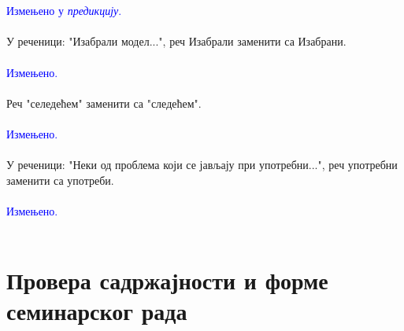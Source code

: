 \documentclass[a4paper]{report}
\newcommand{\odgovor}[1]{\textcolor{blue}{#1}}
\begin{document}
    \\\\
    \odgovor{Измењено у \emph{предикцију}.} 
	\\\\
У реченици: "Изабрали модел...", реч Изабрали заменити са Изабрани.
    \\\\
    \odgovor{Измењено.} 
	\\\\
Реч "селедећем" заменити са "следећем".
    \\\\
    \odgovor{Измењено.} 
	\\\\
У реченици: "Неки од проблема који се јављају при употребни...", реч употребни заменити са употреби.
    \\\\
    \odgovor{Измењено.} 
	\\\\
\section{Провера садржајности и форме семинарског рада}
\end{document}

